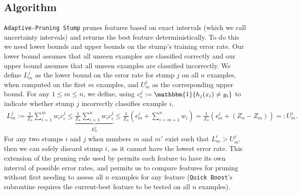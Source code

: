 \subsection{Algorithm}\label{alg}
\texttt{Adaptive-Pruning Stump} prunes features based on
exact intervals (which we call uncertainty intervals) and returns the best feature
deterministically.
To do this we need lower bounds and upper bounds on the stump's
training error rate. 
Our lower bound assumes that all unseen examples are classified
correctly and our upper bound assumes that all unseen examples are classified
incorrectly.
We define $L_m^j$ as the lower bound on the error rate for
stump $j$ on all $n$ examples, when computed on the first $m$ examples,
and $U_m^j$ as the corresponding upper bound.
For any $1 \le m \le n$, we define,
using $c^j_i := \mathbbm{1} \{h_j(x_i) \ne y_i\}$ to indicate
whether stump $j$ incorrectly classifies example $i$,
\begin{align*}
	L_m^j :=
	 \frac{1}{Z_n}
		\sum_{i=1}^m {w_i c^j_i}
	\le  
	\underbrace{
	\frac{1}{Z_n} 
		\sum_{i=1}^n {w_i c^j_i}
	}_{E_n^j}
	\le  \frac{1}{Z_n}\left(
		\epsilon^j_m
		+ \sum_{i=m+1}^n w_i
		\right)
	=
	\frac{1}{Z_n}\left(
		\epsilon^j_m
		+ (Z_n - Z_m)
		\right)
		=: U_m^j.
\end{align*}
%
For any two stumps $i$ and $j$ when numbers $m$ and $m'$ exist
such that $L_m^i > U_{m'}^j$ then we can safely discard stump $i$, as it cannot
have the lowest error rate.
This extension of the pruning rule used by \citet{icml2013_appel13}
permits each feature to have its own interval of possible error
rates, and permits us to compare features for pruning without first
needing to assess all $n$ examples for any feature
(\texttt{Quick Boost}'s subroutine requires the
current-best feature to be tested on all $n$ examples).

